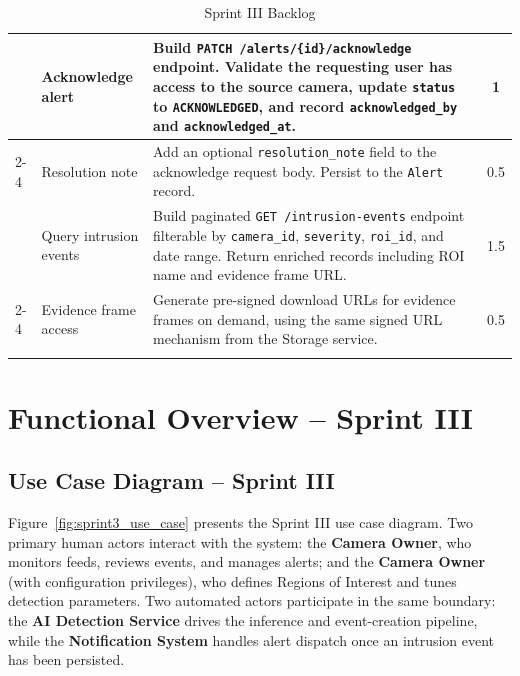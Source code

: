 \begin{sloppypar}
\begin{longtable}{|>{\small}p{2cm}|>{\small}p{4cm}|>{\small}p{5.5cm}|>{\small}c|}
\multirow{2}{*}{\parbox{2cm}{\small Alert Management}} &
Acknowledge alert & Build \texttt{PATCH /alerts/\{id\}/acknowledge} endpoint. Validate the requesting user has access to the source camera, update \texttt{status} to \texttt{ACKNOWLEDGED}, and record \texttt{acknowledged\_by} and \texttt{acknowledged\_at}. & 1 \\ \cline{2-4}
& Resolution note & Add an optional \texttt{resolution\_note} field to the acknowledge request body. Persist to the \texttt{Alert} record. & 0.5 \\ \hline

\multirow{2}{*}{\parbox{2cm}{\small Intrusion History}} &
Query intrusion events & Build paginated \texttt{GET /intrusion-events} endpoint filterable by \texttt{camera\_id}, \texttt{severity}, \texttt{roi\_id}, and date range. Return enriched records including ROI name and evidence frame URL. & 1.5 \\ \cline{2-4}
& Evidence frame access & Generate pre-signed download URLs for evidence frames on demand, using the same signed URL mechanism from the Storage service. & 0.5 \\ \hline

\caption{Sprint III Backlog}
\label{tab:sprint3_backlog}
\end{longtable}
\end{sloppypar}

\section{Functional Overview -- Sprint III}
\label{sec:s3_functional}

\subsection{Use Case Diagram -- Sprint III}
\label{subsec:s3_use_cases}

\hspace{0.8cm}Figure~\ref{fig:sprint3_use_case} presents the Sprint III use case diagram. Two primary human actors interact with the system: the \textbf{Camera Owner}, who monitors feeds, reviews events, and manages alerts; and the \textbf{Camera Owner} (with configuration privileges), who defines Regions of Interest and tunes detection parameters. Two automated actors participate in the same boundary: the \textbf{AI Detection Service} drives the inference and event-creation pipeline, while the \textbf{Notification System} handles alert dispatch once an intrusion event has been persisted.

